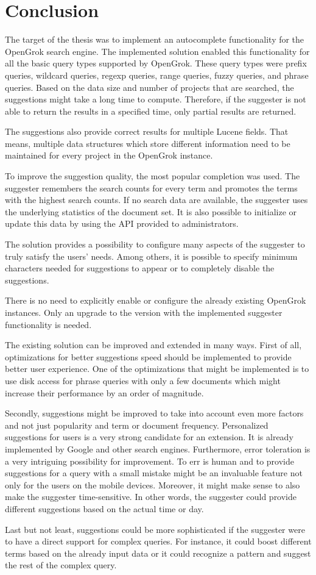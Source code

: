 \chapter*{Conclusion}
\label{chap:epilog}


The target of the thesis was to implement an autocomplete functionality for the OpenGrok search engine. The implemented
solution enabled this functionality for all the basic query types supported by OpenGrok. These query types were prefix queries,
wildcard queries, regexp queries, range queries, fuzzy queries, and phrase queries. Based on the data size and number of projects
that are searched, the suggestions might take a long time to compute. Therefore, if the suggester is not able to return
the results in a specified time, only partial results are returned.

The suggestions also provide correct results for multiple Lucene fields. That means, multiple data structures
which store different information need to be maintained for every project in the OpenGrok instance.

To improve the suggestion quality, the most popular completion was used. The suggester remembers the search counts
for every term and promotes the terms with the highest search counts. If no search data are available, the suggester
uses the underlying statistics of the document set. It is also possible to initialize or update this data by using the API
provided to administrators.

The solution provides a possibility to configure many aspects of the suggester to truly satisfy the users' needs.
Among others, it is possible to specify minimum characters needed for suggestions to appear or to completely disable
the suggestions.

There is no need to explicitly enable or configure the already existing OpenGrok instances. Only an upgrade to the
version with the implemented suggester functionality is needed.

The existing solution can be improved and extended in many ways. First of all, optimizations for better suggestions
speed should be implemented to provide better user experience. One of the optimizations that might be implemented is to use
disk access for phrase queries with only a few documents which might increase their performance by an order of magnitude.

Secondly, suggestions might be improved to take into account even more factors and not just popularity and term or document frequency.
Personalized suggestions for users is a very strong candidate for an extension. It is already implemented by Google and
other search engines. Furthermore, error toleration is a very intriguing possibility for improvement. To err is human and
to provide suggestions for a query with a small mistake might be an invaluable feature not only for the users on the mobile devices.
Moreover, it might make sense to also make the suggester time-sensitive. In other words, the suggester could provide
different suggestions based on the actual time or day.

Last but not least, suggestions could be more sophisticated if the suggester were to have a direct support for complex queries.
For instance, it could boost different terms based on the already input data or it could recognize a pattern and suggest
the rest of the complex query.

